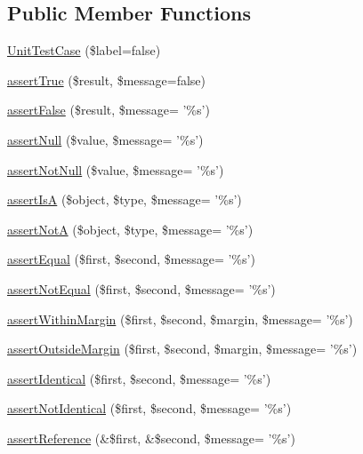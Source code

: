 \subsection*{Public Member Functions}
\begin{DoxyCompactItemize}
\item 
\hyperlink{class_unit_test_case_affc46b2886ff25f1d99af2aaed64a963}{UnitTestCase} (\$label=false)
\item 
\hyperlink{class_unit_test_case_a0dfaf4fc311df202de45e0c26919de3f}{assertTrue} (\$result, \$message=false)
\item 
\hyperlink{class_unit_test_case_a05b9da85b91d042555b87708b33cbeb2}{assertFalse} (\$result, \$message= '\%s')
\item 
\hyperlink{class_unit_test_case_a73855c4eea57a82974690087843f5b17}{assertNull} (\$value, \$message= '\%s')
\item 
\hyperlink{class_unit_test_case_ac03def71a0930bb27c6bfe166187a30d}{assertNotNull} (\$value, \$message= '\%s')
\item 
\hyperlink{class_unit_test_case_acd747d04be9d2e06b526093e4affdab3}{assertIsA} (\$object, \$type, \$message= '\%s')
\item 
\hyperlink{class_unit_test_case_ade7bbd612cc583ba67dd251064e4fa20}{assertNotA} (\$object, \$type, \$message= '\%s')
\item 
\hyperlink{class_unit_test_case_a93868351d598a6b80388eeb446c9daaf}{assertEqual} (\$first, \$second, \$message= '\%s')
\item 
\hyperlink{class_unit_test_case_a9b932083f42caa678fed9572b9cf6468}{assertNotEqual} (\$first, \$second, \$message= '\%s')
\item 
\hyperlink{class_unit_test_case_a60e3a3a68cd4edfedcf2a2a96d68549a}{assertWithinMargin} (\$first, \$second, \$margin, \$message= '\%s')
\item 
\hyperlink{class_unit_test_case_a8e3b8d5600731e494ad281ea165f2a53}{assertOutsideMargin} (\$first, \$second, \$margin, \$message= '\%s')
\item 
\hyperlink{class_unit_test_case_ac44a3356c9546370e31cd5e71123c5bd}{assertIdentical} (\$first, \$second, \$message= '\%s')
\item 
\hyperlink{class_unit_test_case_a35ac184f9c99528c11929ca8a177ebf9}{assertNotIdentical} (\$first, \$second, \$message= '\%s')
\item 
\hyperlink{class_unit_test_case_a14a8294747390eb7ce1238d0fb00d5f1}{assertReference} (\&\$first, \&\$second, \$message= '\%s')
\item 

\end{DoxyCompactItemize}
